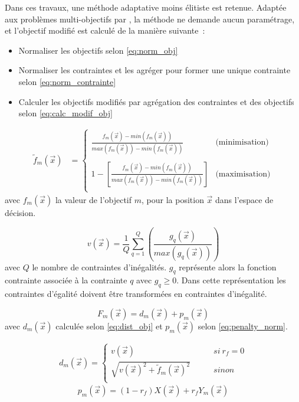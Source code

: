 Dans ces travaux, une méthode adaptative moins élitiste est retenue. Adaptée
aux problèmes multi-objectifs par \textcite{Woldesenbet20073077}, la méthode ne demande
aucun paramétrage, et l’objectif modifié est calculé de la manière suivante~:
\begin{itemize}
  \item Normaliser les objectifs selon \eqref{eq:norm_obj}
  \item Normaliser les contraintes et les agréger pour former une unique contrainte selon \eqref{eq:norm_contrainte}
  \item Calculer les objectifs modifiés par agrégation des contraintes et des objectifs selon \eqref{eq:calc_modif_obj}
\end{itemize}

\begin{align}\label{eq:norm_obj}
  \tilde{f}_{m}(\vec{x}) &= \begin{cases}
    \frac{f_{m}(\vec{x}) - min(f_{m}(\vec{x}))}{max(f_{m}(\vec{x})) - min(f_{m}(\vec{x}))}
    & \text{(minimisation)} \\ \\ 1 - \left[\frac{f_{m}(\vec{x}) -
    min(f_{m}(\vec{x}))}{max(f_{m}(\vec{x})) - min(f_{m}(\vec{x}))}\right] &
    \text{(maximisation)} \\
  \end{cases}
\end{align}
avec $f_{m}(\vec{x})$ la valeur de l’objectif $m$, pour la position $\vec{x}$ dans l’espace de décision.

\begin{equation}\label{eq:norm_contrainte}
  v(\vec{x}) = \frac{1}{Q} \sum_{q=1}^{Q} \left(\frac{g_{q}(\vec{x})}{max(g_{q}(\vec{x}))}\right)
\end{equation}
avec $Q$ le nombre de contraintes d’inégalités. $g_{q}$ représente alors la fonction contrainte
associée à la contrainte $q$ avec $g_{q} \geq 0$. Dans cette représentation les contraintes
d’égalité doivent être transformées en contraintes d’inégalité.

\begin{equation}\label{eq:calc_modif_obj}
  F_{m}(\vec{x}) = d_{m}(\vec{x}) + p_{m}(\vec{x})
\end{equation}
avec $d_{m}(\vec{x})$ calculée selon \eqref{eq:dist_obj} et $ p_{m}(\vec{x})$ selon \eqref{eq:penalty_norm}.


\begin{align}\label{eq:dist_obj}
  d_{m}(\vec{x}) = \begin{cases}
                          v(\vec{x})                                     & \qquad si\  r_{f} = 0 \\
                          \sqrt{v(\vec{x})^2 + \tilde{f}_{m}(\vec{x})^2} & \qquad sinon          \\
                    \end{cases}
\end{align}
\begin{equation}\label{eq:penalty_norm}
  p_{m}(\vec{x}) = (1 - r_{f})  X(\vec{x}) + r_{f} Y_{m}(\vec{x})
\end{equation}

